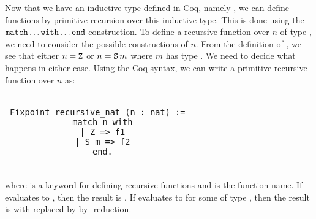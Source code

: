 Now that we have an inductive type defined in Coq, namely , we can define functions by primitive recursion over this inductive type. This is done using the $\texttt{match} \ldots \texttt{with} \ldots \texttt{end}$ construction. To define a recursive function over $n$ of type , we need to consider the possible constructions of $n$. From the definition of , we see that either $n = \texttt{Z}$ or $n = \texttt{S} \, m$ where $m$ has type . We need to decide what happens in either case. Using the Coq syntax, we can write a primitive recursive function over $n$ as:
\begin{center}
\begin{tabular}{c}
\begin{lstlisting}
Fixpoint recursive_nat (n : nat) :=
  match n with
  | Z => f1
  | S m => f2
  end.
\end{lstlisting}
\end{tabular}
\end{center}
where  is a keyword for defining recursive functions and  is the function name. If  evaluates to , then the result is . If  evaluates to  for some  of type , then the result is  with  replaced by  by \iota-reduction.

